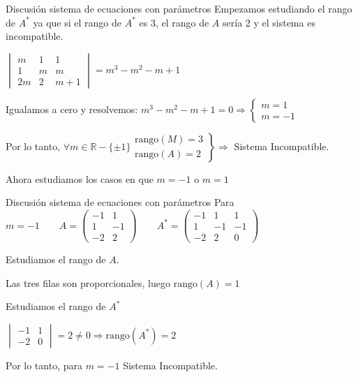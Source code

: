 \documentclass[9pt]{beamer}
\newcommand{\R}{\mathbb{R}}
\begin{document}
\begin{frame}{Discusión sistema de ecuaciones con parámetros}
Empezamos estudiando el rango de $A^*$ ya que si el rango de $A^*$ es 3, el rango de $A$ sería 2 y el sistema es incompatible.
\pause

$ \begin{vmatrix}
m & 1 & 1 \\
1 & m & m \\
2m & 2 & m+1
\end{vmatrix}= m^3-m^2-m+1 $
\pause

Igualamos a cero y resolvemos: $m^3-m^2-m+1= 0 \Rightarrow \begin{cases} m=1 \\ m=-1 \end{cases}$
\pause

Por lo tanto, $\forall m \in \R - \{\pm 1\} \left. \begin{array}{l} \text{rango} (M)=3 \\  \text{rango} (A)= 2 \end{array} \right\rbrace \Rightarrow$ Sistema Incompatible.

\pause
Ahora estudiamos los casos en que $m=-1$ o $m=1$
\end{frame}

\begin{frame}{Discusión sistema de ecuaciones con parámetros}
Para $m=-1 \qquad A=\begin{pmatrix}
-1 & 1  \\
1 & -1  \\
-2 & 2  
\end{pmatrix} 
\qquad A^*=\begin{pmatrix}
-1 & 1 & 1 \\
1 & -1 & -1 \\
-2 & 2 & 0 
\end{pmatrix}$
\pause

Estudiamos el rango de $A$.
\pause

Las tres filas son proporcionales, luego $\text{rango}(A)=1$

\pause
Estudiamos el rango de $A^*$
\pause

$\begin{vmatrix}
-1 & 1 \\
-2 & 0
\end{vmatrix}= 2 \neq 0 \Rightarrow \text{rango}(A^*)=2 $
\pause

Por lo tanto, para $m=-1$ Sistema Incompatible.
\end{frame}
\end{document}
